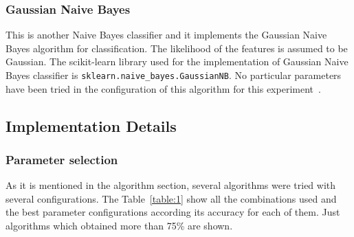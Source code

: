 \documentclass[letterpaper,10pt]{article}
\theoremstyle{mytheor}
\begin{document}
\subsubsection{Gaussian Naive Bayes}
This is another Naive Bayes classifier and it implements the Gaussian Naive Bayes algorithm for classification. The likelihood of the features is assumed to be Gaussian. The scikit-learn library used for the implementation of Gaussian Naive Bayes classifier is \lstinline|sklearn.naive_bayes.GaussianNB|. No particular parameters have been tried in the configuration of this algorithm for this experiment~\cite{scikit-learn}.

\subsection{Implementation Details}

\subsubsection{Parameter selection}
As it is mentioned in the algorithm section, several algorithms were tried with several configurations. The Table~\ref{table:1} show all the combinations used and the best parameter configurations according its accuracy for each of them. Just algorithms which obtained more than 75\% are shown.
\end{document}
